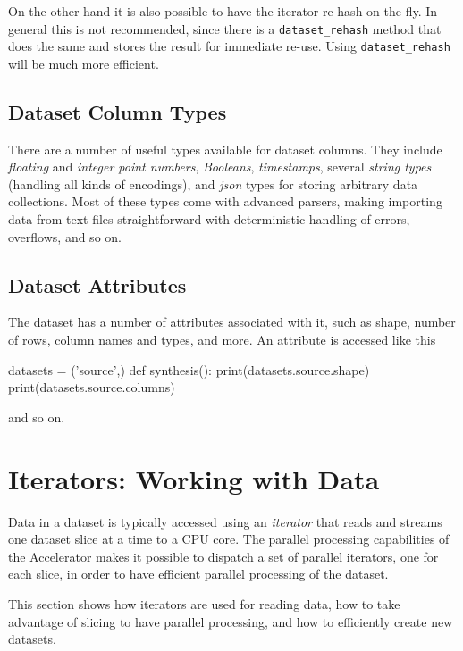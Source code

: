 On the other hand it is also possible to have the iterator re-hash
on-the-fly.  In general this is not recommended, since there is a
\texttt{dataset\_rehash} method that does the same and stores the
result for immediate re-use.  Using \texttt{dataset\_rehash} will be
much more efficient.




\subsection{Dataset Column Types}

There are a number of useful types available for dataset columns.
They include \textsl{floating} and \textsl{integer point numbers},
\textsl{Booleans}, \textsl{timestamps}, several \textsl{string types}
(handling all kinds of encodings), and \textsl{json} types for storing
arbitrary data collections.  Most of these types come with advanced
parsers, making importing data from text files straightforward with
deterministic handling of errors, overflows, and so on.



\subsection{Dataset Attributes}
The dataset has a number of attributes associated with it, such as
shape, number of rows, column names and types, and more.
An attribute is accessed like this
\begin{python}
datasets = ('source',)
def synthesis():
    print(datasets.source.shape)
    print(datasets.source.columns)
\end{python}
and so on.



\section{Iterators: Working with Data}

Data in a dataset is typically accessed using an \emph{iterator} that
reads and streams one dataset slice at a time to a CPU core.  The
parallel processing capabilities of the Accelerator makes it possible
to dispatch a set of parallel iterators, one for each slice, in order
to have efficient parallel processing of the dataset.

This section shows how iterators are used for reading data, how to
take advantage of slicing to have parallel processing, and how to
efficiently create new datasets.

